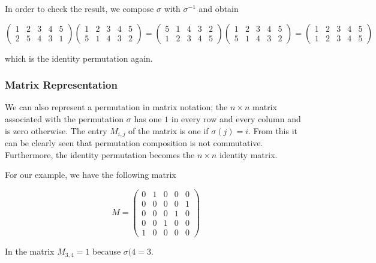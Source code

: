 In order to check the result, we compose \(\sigma\) with \(\sigma^{-1}\)
and obtain

\[
\begin{pmatrix}
1 & 2 & 3 & 4 & 5 \\
2 & 5 & 4 & 3 & 1
\end{pmatrix}
\begin{pmatrix}
1 & 2 & 3 & 4 & 5\\
5 & 1 & 4 & 3 & 2
\end{pmatrix}
=
\begin{pmatrix}
5 & 1 & 4 & 3 & 2 \\
1 & 2 & 3 & 4 & 5
\end{pmatrix}
\begin{pmatrix}
1 & 2 & 3 & 4 & 5\\
5 & 1 & 4 & 3 & 2
\end{pmatrix}
=
\begin{pmatrix}
1 & 2 & 3 & 4 & 5\\
1 & 2 & 3 & 4 & 5
\end{pmatrix}
\]

which is the identity permutation again.

\subsubsection{Matrix Representation}

We can also represent a permutation in matrix notation; the
\(n \times n\) matrix associated with the permutation \(\sigma\) has one
\(1\) in every row and every column and is zero otherwise. The entry
\(M_{i,j}\) of the matrix is one if \(\sigma(j) = i\). From this it can
be clearly seen that permutation composition is not commutative.
Furthermore, the identity permutation becomes the \(n \times n\)
identity matrix.

For our example, we have the following matrix

\[
M = 
\begin{pmatrix}
0 & 1 & 0 & 0 & 0\\
0 & 0 & 0 & 0 & 1\\
0 & 0 & 0 & 1 & 0\\
0 & 0 & 1 & 0 & 0\\
1 & 0 & 0 & 0 & 0
\end{pmatrix}
\]

In the matrix \(M_{3,4} = 1\) because \(\sigma(4 = 3\).
